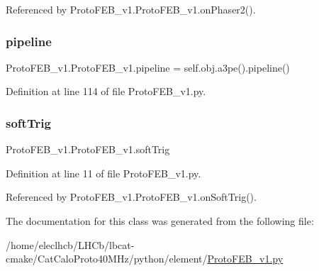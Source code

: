 Referenced by Proto\+F\+E\+B\+\_\+v1.\+Proto\+F\+E\+B\+\_\+v1.\+on\+Phaser2().

\mbox{\label{classProtoFEB__v1_1_1ProtoFEB__v1_aecb91e3bed2001c4c03c02bfd9fc86b0}} 
\subsubsection{\texorpdfstring{pipeline}{pipeline}}
{\footnotesize\ttfamily Proto\+F\+E\+B\+\_\+v1.\+Proto\+F\+E\+B\+\_\+v1.\+pipeline = self.\+obj.\+a3pe().pipeline()\hspace{0.3cm}{\ttfamily [static]}}



Definition at line 114 of file Proto\+F\+E\+B\+\_\+v1.\+py.

\mbox{\label{classProtoFEB__v1_1_1ProtoFEB__v1_ad7ba35e015e88cd43cad53cd547c3183}} 
\subsubsection{\texorpdfstring{soft\+Trig}{softTrig}}
{\footnotesize\ttfamily Proto\+F\+E\+B\+\_\+v1.\+Proto\+F\+E\+B\+\_\+v1.\+soft\+Trig}



Definition at line 11 of file Proto\+F\+E\+B\+\_\+v1.\+py.



Referenced by Proto\+F\+E\+B\+\_\+v1.\+Proto\+F\+E\+B\+\_\+v1.\+on\+Soft\+Trig().



The documentation for this class was generated from the following file\+:\begin{DoxyCompactItemize}
\item 
/home/eleclhcb/\+L\+H\+Cb/lbcat-\/cmake/\+Cat\+Calo\+Proto40\+M\+Hz/python/element/\hyperlink{ProtoFEB__v1_8py}{Proto\+F\+E\+B\+\_\+v1.\+py}\end{DoxyCompactItemize}
